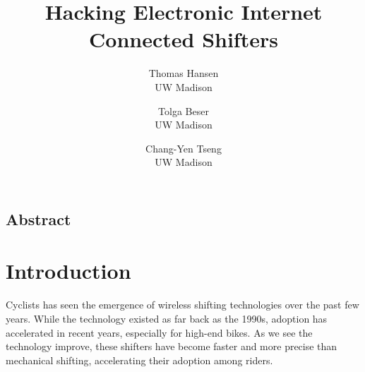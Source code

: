 \documentclass[letterpaper,twocolumn,10pt]{article}
\begin{document}
\date{}

\title{\Large \bf Hacking Electronic Internet Connected Shifters }

\author{
  {\rm Thomas Hansen}\\
  UW Madison
  \and
  {\rm Tolga Beser}\\
  UW Madison
  \and
  {\rm Chang-Yen Tseng}\\
  UW Madison
} %

\maketitle

\thispagestyle{empty}


\subsection*{Abstract}


\section{Introduction}



Cyclists has seen the emergence of wireless shifting technologies over the past few years. While the technology existed as far back as the 1990s, adoption has accelerated in recent years, especially for high-end bikes. As we see the technology improve, these shifters have become faster and more precise than mechanical shifting, accelerating their adoption among riders.
\end{document}
